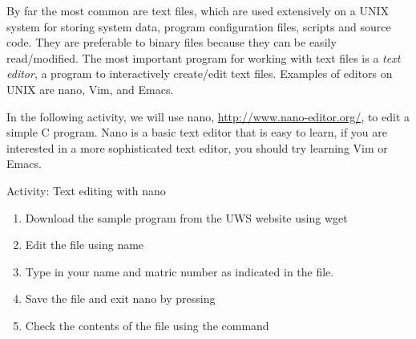 By far the most common are text files, which are used extensively on a UNIX
system for storing system data, program configuration files, scripts and source
code. They are preferable to binary files because they can be easily
read/modified.  The most important program for working with text files is a
\emph{text editor}, a program to interactively create/edit text files.  Examples
of editors on UNIX are nano, Vim, and Emacs.

\begin{frame}
\end{frame}

In the following activity, we will use nano, \url{http://www.nano-editor.org/},
to edit a simple C program. Nano is a basic text editor that is easy to learn,
if you are interested in a more sophisticated text editor, you should try
learning Vim or Emacs.  

\begin{frame}[fragile]{Activity: Text editing with nano}
\begin{enumerate}
\item Download the sample  program from the UWS website using wget
\item Edit the file using name 
\item Type in your name and matric number as indicated in the file.  
\item Save the file and exit nano by pressing 
\item Check the contents of the file using the  command
\end{enumerate}
\end{frame}

